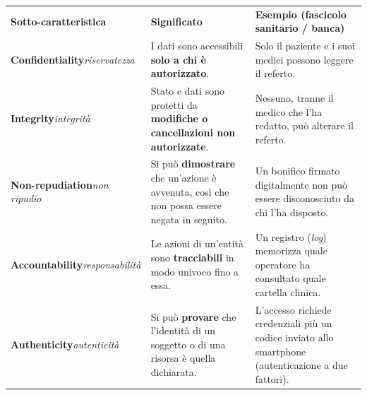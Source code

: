 


\begin{table}[H]
\centering
\renewcommand{\arraystretch}{1.4}
\begin{tabularx}{\textwidth}{P{3.6cm} L L}
\textbf{Sotto-caratteristica} & \textbf{Significato} & \textbf{Esempio (fascicolo sanitario / banca)} \\
\textbf{Confidentiality}\newline\textit{\small riservatezza} & I dati sono accessibili \textbf{solo a chi è autorizzato}. & Solo il paziente e i suoi medici possono leggere il referto. \\
\textbf{Integrity}\newline\textit{\small integrità} & Stato e dati sono protetti da \textbf{modifiche o cancellazioni non autorizzate}. & Nessuno, tranne il medico che l'ha redatto, può alterare il referto. \\
\textbf{Non-repudiation}\newline\textit{\small non ripudio} & Si può \textbf{dimostrare} che un'azione è avvenuta, così che non possa essere negata in seguito. & Un bonifico firmato digitalmente non può essere disconosciuto da chi l'ha disposto. \\
\textbf{Accountability}\newline\textit{\small responsabilità} & Le azioni di un'entità sono \textbf{tracciabili} in modo univoco fino a essa. & Un registro (\textit{log}) memorizza quale operatore ha consultato quale cartella clinica. \\
\textbf{Authenticity}\newline\textit{\small autenticità} & Si può \textbf{provare} che l'identità di un soggetto o di una risorsa è quella dichiarata. & L'accesso richiede credenziali più un codice inviato allo smartphone (autenticazione a due fattori). \\
\bottomrule
\end{tabularx}
\end{table}

